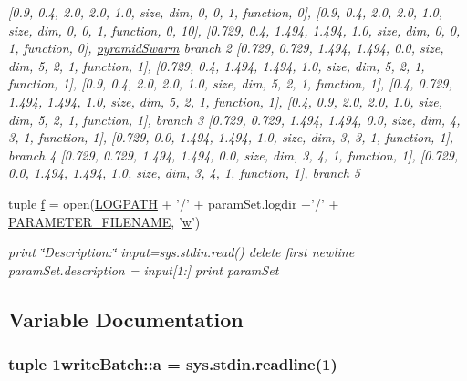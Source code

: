 \begin{CompactItemize}
\begin{CompactList}\small\item\em \mbox{[}0.9, 0.4, 2.0, 2.0, 1.0, size, dim, 0, 0, 1, function, 0\mbox{]}, \mbox{[}0.9, 0.4, 2.0, 2.0, 1.0, size, dim, 0, 0, 1, function, 0, 10\mbox{]}, \mbox{[}0.729, 0.4, 1.494, 1.494, 1.0, size, dim, 0, 0, 1, function, 0\mbox{]}, \hyperlink{pso_8h_42bcedc2c7cf9459c9669f9df4f61ebd7534f884423a2349847018fa62c37966}{pyramidSwarm} branch 2 \mbox{[}0.729, 0.729, 1.494, 1.494, 0.0, size, dim, 5, 2, 1, function, 1\mbox{]}, \mbox{[}0.729, 0.4, 1.494, 1.494, 1.0, size, dim, 5, 2, 1, function, 1\mbox{]}, \mbox{[}0.9, 0.4, 2.0, 2.0, 1.0, size, dim, 5, 2, 1, function, 1\mbox{]}, \mbox{[}0.4, 0.729, 1.494, 1.494, 1.0, size, dim, 5, 2, 1, function, 1\mbox{]}, \mbox{[}0.4, 0.9, 2.0, 2.0, 1.0, size, dim, 5, 2, 1, function, 1\mbox{]}, branch 3 \mbox{[}0.729, 0.729, 1.494, 1.494, 0.0, size, dim, 4, 3, 1, function, 1\mbox{]}, \mbox{[}0.729, 0.0, 1.494, 1.494, 1.0, size, dim, 3, 3, 1, function, 1\mbox{]}, branch 4 \mbox{[}0.729, 0.729, 1.494, 1.494, 0.0, size, dim, 3, 4, 1, function, 1\mbox{]}, \mbox{[}0.729, 0.0, 1.494, 1.494, 1.0, size, dim, 3, 4, 1, function, 1\mbox{]}, branch 5 \item\end{CompactList}\item 
tuple \hyperlink{namespace1writeBatch_f4e8a81ebc8e5816186ac1dc5e643b73}{f} = open(\hyperlink{namespace1writeBatch_881ecbadb139f162fdc515a7e137af1c}{LOGPATH} + '/' + paramSet.logdir +'/' + \hyperlink{namespace1writeBatch_f67acb0a0795d91f6b2129a95004f4c7}{PARAMETER\_\-FILENAME}, '\hyperlink{runpso_8cpp_fb3248bab1c7ee0ad97e9d4c275b4c67}{w}')
\begin{CompactList}\small\item\em print \char`\"{}Description:\char`\"{} input=sys.stdin.read() delete first newline paramSet.description = input\mbox{[}1:\mbox{]} print paramSet \item\end{CompactList}\end{CompactItemize}


\subsection{Variable Documentation}
\hypertarget{namespace1writeBatch_15e49200b8cdfb4e0d00f8a4546b2b24}{
\subsubsection{\setlength{\rightskip}{0pt plus 5cm}tuple 1writeBatch::a = sys.stdin.readline(1)}}
\label{namespace1writeBatch_15e49200b8cdfb4e0d00f8a4546b2b24}


